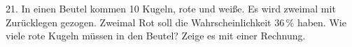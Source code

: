 \documentclass[11pt]{article}
\begin{document}
\begin{pfaufg}{}{21.}{}
In einen Beutel kommen 10 Kugeln, rote und weiße. Es wird zweimal mit Zurücklegen gezogen. Zweimal Rot soll die Wahrscheinlichkeit $36\,\%$ haben. Wie viele rote Kugeln müssen in den Beutel? Zeige es mit einer Rechnung.
\end{pfaufg}

\par\vfill{}
\end{document}

